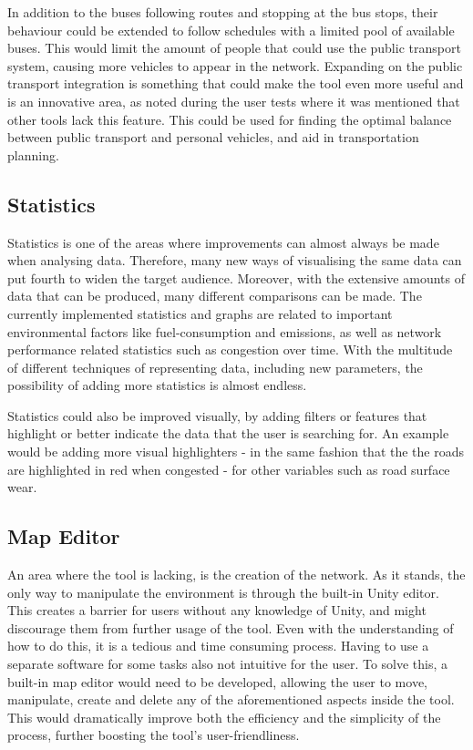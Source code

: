         In addition to the buses following routes and stopping at the bus stops, their behaviour could be extended to follow schedules with a limited pool of available buses. This would limit the amount of people that could use the public transport system, causing more vehicles to appear in the network. Expanding on the public transport integration is something that could make the tool even more useful and is an innovative area, as noted during the user tests where it was mentioned that other tools lack this feature. This could be used for finding the optimal balance between public transport and personal vehicles, and aid in transportation planning.

    \subsection{Statistics}
        Statistics is one of the areas where improvements can almost always be made when analysing data. Therefore, many new ways of visualising the same data can put fourth to widen the target audience. Moreover, with the extensive amounts of data that can be produced, many different comparisons can be made. The currently implemented statistics and graphs are related to important environmental factors like fuel-consumption and emissions, as well as network performance related statistics such as congestion over time. With the multitude of different techniques of representing data, including new parameters, the possibility of adding more statistics is almost endless.

        Statistics could also be improved visually, by adding filters or features that highlight or better indicate the data that the user is searching for. An example would be adding more visual highlighters - in the same fashion that the the roads are highlighted in red when congested - for other variables such as road surface wear.

    \subsection{Map Editor}
        An area where the tool is lacking, is the creation of the network. As it stands, the only way to manipulate the environment is through the built-in Unity editor. This creates a barrier for users without any knowledge of Unity, and might discourage them from further usage of the tool. Even with the understanding of how to do this, it is a tedious and time consuming process. Having to use a separate software for some tasks also not intuitive for the user. To solve this, a built-in map editor would need to be developed, allowing the user to move, manipulate, create and delete any of the aforementioned aspects inside the tool. This would dramatically improve both the efficiency and the simplicity of the process, further boosting the tool's user-friendliness.